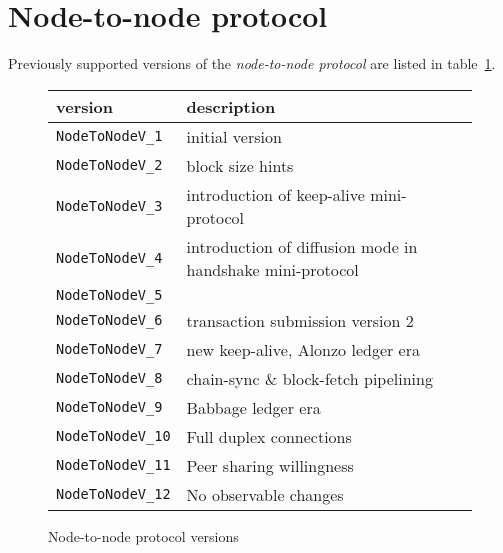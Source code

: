 \documentclass{report}
\newcommand{\header}[1]{\textbf{#1}}
\begin{document}
\section{Node-to-node protocol}
Previously supported versions of the \textit{node-to-node protocol} are listed
in table~\ref{table:historical-node-to-node-protocol-versions}.
\begin{figure}[h]
  \begin{center}
    \begin{tabular}{l|l}
      \header{version}        & \header{description} \\\hline
      \texttt{NodeToNodeV\_1} & initial version \\
      \texttt{NodeToNodeV\_2} & block size hints \\
      \texttt{NodeToNodeV\_3} & introduction of keep-alive mini-protocol \\
      \texttt{NodeToNodeV\_4} & introduction of diffusion mode in handshake mini-protocol \\
      \texttt{NodeToNodeV\_5} & \\
      \texttt{NodeToNodeV\_6} & transaction submission version 2 \\
      \texttt{NodeToNodeV\_7} & new keep-alive, Alonzo ledger era \\
      \texttt{NodeToNodeV\_8} & chain-sync \& block-fetch pipelining \\
      \texttt{NodeToNodeV\_9} & Babbage ledger era \\
      \texttt{NodeToNodeV\_10} & Full duplex connections \\
      \texttt{NodeToNodeV\_11} & Peer sharing willingness \\
      \texttt{NodeToNodeV\_12} & No observable changes \\
    \end{tabular}
    \caption{Node-to-node protocol versions}
    \label{table:historical-node-to-node-protocol-versions}
  \end{center}
\end{figure}
\end{document}
